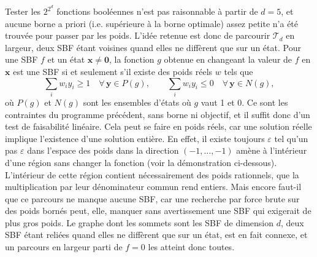 \documentclass[12pt, a4paper]{article}
\begin{document}
Tester les $2^{2^d}$ fonctions booléennes n'est pas raisonnable à partir de $d = 5$, et aucune borne a priori (i.e. supérieure à la borne optimale) assez petite n'a été trouvée pour passer par les poids.
L'idée retenue est donc de parcourir $\mathcal{T}_d$ en largeur, deux SBF étant voisines quand elles ne diffèrent que sur un état.
Pour une SBF $f$ et un état $\mathbf{x} \neq \mathbf{0}$, la fonction $g$ obtenue en changeant la valeur de $f$ en $\mathbf{x}$ est une SBF si et seulement s'il existe des poids réels $w$ tels que
\begin{equation}
\label{eq:faisabilite}
\textstyle\sum_i w_i y_i \ge 1 \quad \forall\, \mathbf{y} \in P(g),
\qquad
\textstyle\sum_i w_i y_i \le 0 \quad \forall\, \mathbf{y} \in N(g),
\end{equation}
où $P(g)$ et $N(g)$ sont les ensembles d'états où $g$ vaut 1 et 0.
Ce sont les contraintes du programme précédent, sans borne ni objectif, et il suffit donc d'un test de faisabilité linéaire. Cela peut se faire en poids réels, car une solution réelle implique l'existence d'une solution entière.
En effet, il existe toujours $\varepsilon$ tel qu'un pas $\varepsilon$ dans l'espace des poids dans la direction $(-1,\dots,-1)$ amène à l'intérieur d'une région sans changer la fonction (voir la démonstration ci-dessous). L'intérieur de cette région contient nécessairement des poids rationnels, que la multiplication par leur dénominateur commun rend entiers.
Mais encore faut-il que ce parcours ne manque aucune SBF, car une recherche par force brute sur des poids bornés peut, elle, manquer sans avertissement une SBF qui exigerait de plus gros poids.
Le graphe dont les sommets sont les SBF de dimension $d$, deux SBF étant reliées quand elles ne diffèrent que sur un état, est en fait connexe, et un parcours en largeur parti de $f = 0$ les atteint donc toutes.
\end{document}
